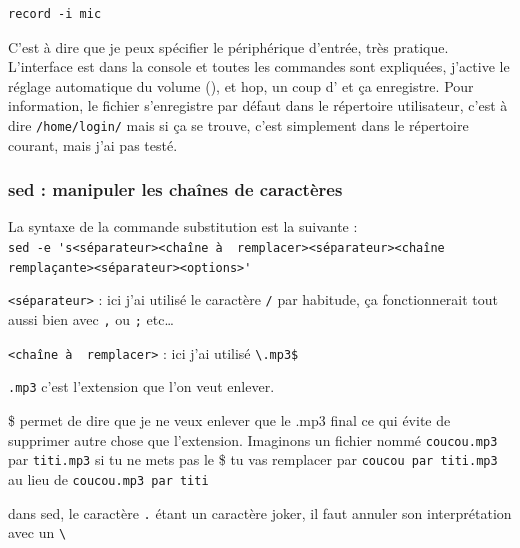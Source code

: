 \documentclass[a4paper,twoside]{article}
\begin{document}
\begin{verbatim}
record -i mic
\end{verbatim}

C'est à dire que je peux spécifier le périphérique d'entrée, très pratique. L'interface est dans la console et toutes les commandes sont expliquées, j'active le réglage automatique du volume (), et hop, un coup d' et ça enregistre. Pour information, le fichier s'enregistre par défaut dans le répertoire utilisateur, c'est à dire \verb|/home/login/| mais si ça se trouve, c'est simplement dans le répertoire courant, mais j'ai pas testé.

\subsubsection{sed : manipuler les chaînes de caractères}
La syntaxe de la commande substitution est la suivante :\\
{\footnotesize\verb|sed -e 's|{\red \verb|<séparateur>|}{\blue \verb|<chaîne à  remplacer>|}{\red \verb|<séparateur>|}{\blue \verb|<chaîne remplaçante>|}{\red \verb|<séparateur>|}{\blue \verb|<options>|}\verb|'|}

{\red \verb|<séparateur>|} : ici j'ai utilisé le caractère \verb|/| par habitude, ça fonctionnerait tout aussi bien avec \verb|,| ou \verb|;| etc\ldots

{\blue \verb|<chaîne à  remplacer>|} : ici j'ai utilisé \verb|\.mp3$|
\begin{description}
\item \verb|.mp3| c'est l'extension que l'on veut enlever.
\item \$ permet de dire que je ne veux enlever que le .mp3 final ce qui évite de supprimer autre chose que l'extension. Imaginons un fichier nommé \verb|coucou.mp3| par \verb|titi.mp3| si tu ne mets pas le \$ tu vas remplacer par \verb|coucou par titi.mp3| au lieu de \verb|coucou.mp3 par titi|
\item dans sed, le caractère \verb|.| étant un caractère joker, il faut annuler son interprétation avec un \verb|\|
\end{description}

\end{document}
